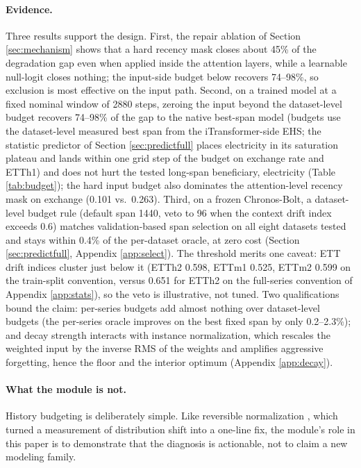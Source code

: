 \paragraph{Evidence.}
Three results support the design. First, the repair ablation of Section \ref{sec:mechanism} shows that a hard recency mask closes about 45\% of the degradation gap even when applied inside the attention layers, while a learnable null-logit closes nothing; the input-side budget below recovers 74--98\%, so exclusion is most effective on the input path. Second, on a trained model at a fixed nominal window of 2880 steps, zeroing the input beyond the dataset-level budget recovers 74--98\% of the gap to the native best-span model (budgets use the dataset-level measured best span from the iTransformer-side EHS; the statistic predictor of Section \ref{sec:predictfull} places electricity in its saturation plateau and lands within one grid step of the budget on exchange rate and ETTh1) and does not hurt the tested long-span beneficiary, electricity (Table \ref{tab:budget}); the hard input budget also dominates the attention-level recency mask on exchange (0.101 vs.\ 0.263). Third, on a frozen Chronos-Bolt, a dataset-level budget rule (default span 1440, veto to 96 when the context drift index exceeds 0.6) matches validation-based span selection on all eight datasets tested and stays within 0.4\% of the per-dataset oracle, at zero cost (Section \ref{sec:predictfull}, Appendix \ref{app:select}). The threshold merits one caveat: ETT drift indices cluster just below it (ETTh2 0.598, ETTm1 0.525, ETTm2 0.599 on the train-split convention, versus 0.651 for ETTh2 on the full-series convention of Appendix \ref{app:stats}), so the veto is illustrative, not tuned. Two qualifications bound the claim: per-series budgets add almost nothing over dataset-level budgets (the per-series oracle improves on the best fixed span by only 0.2--2.3\%); and decay strength interacts with instance normalization, which rescales the weighted input by the inverse RMS of the weights and amplifies aggressive forgetting, hence the floor and the interior optimum (Appendix \ref{app:decay}).

\paragraph{What the module is not.}
History budgeting is deliberately simple. Like reversible normalization \citep{revin}, which turned a measurement of distribution shift into a one-line fix, the module's role in this paper is to demonstrate that the diagnosis is actionable, not to claim a new modeling family.
